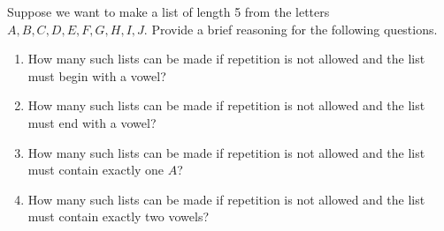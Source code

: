 \documentclass{article}
\theoremstyle{definition}
\begin{document}
\begin{question}
    Suppose we want to make a list of length 5 from the letters $A, B, C, D, E, F, G, H, I, J$. Provide a brief reasoning for the following questions.
        \begin{enumerate}
            \item How many such lists can be made if repetition is not allowed and the list must begin with a vowel?
            \item How many such lists can be made if repetition is not allowed and the list must end with a vowel?
            \item How many such lists can be made if repetition is not allowed and the list must contain exactly one $A$?
            \item How many such lists can be made if repetition is not allowed and the list must contain exactly two vowels?
        \end{enumerate}
\end{question}
\end{document}
